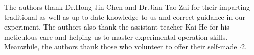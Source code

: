 \begin{acknowledgement}

The authors thank Dr.Hong-Jin Chen and Dr.Jian-Tao Zai for their imparting traditional as well as up-to-date knowledge to us and correct guidance in our experiment. The authors also thank the assistant teacher Kai He for his meticulous care and helping us to master experimental operation skills. Meanwhile, the authors thank those who volunteer to offer their self-made $\cdot$2.

\end{acknowledgement}